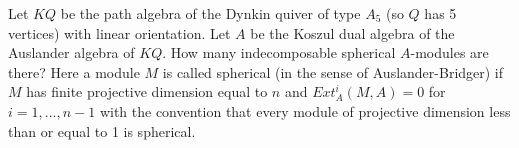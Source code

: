 Let $KQ$ be the path algebra of the Dynkin quiver of type $A_5$ (so $Q$ has 5 vertices) with linear orientation. Let $A$ be the Koszul dual algebra of the Auslander algebra of $KQ$. How many indecomposable spherical $A$-modules are there? Here a module $M$ is called spherical (in the sense of Auslander-Bridger) if $M$ has finite projective dimension equal to $n$ and $Ext_A^i(M,A)=0$ for $i=1,...,n-1$ with the convention that every module of projective dimension less than or equal to 1 is spherical.
